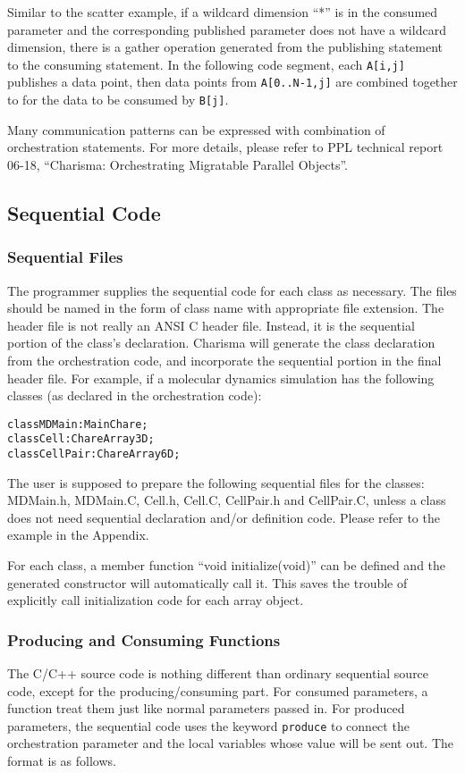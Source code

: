\documentclass[10pt]{article}
\def\code#1{{\small {\tt {#1}}}}
\begin{document}
Similar to the scatter example, if a wildcard dimension ``*'' is in the
consumed parameter and the corresponding published parameter does not have a
wildcard dimension, there is a gather operation generated from the publishing
statement to the consuming statement. In the following code segment, each 
\code{A[i,j]} publishes a data point, then data points from \code{A[0..N-1,j]} are
combined together to for the data to be consumed by \code{B[j]}.  

Many communication patterns can be expressed with combination of orchestration
statements. For more details, please refer to PPL technical report 06-18,
``Charisma: Orchestrating Migratable Parallel Objects''.

\subsection{Sequential Code}
\label{sec:sequential}

\subsubsection{Sequential Files}
The programmer supplies the sequential code for each class as necessary. The
files should be named in the form of class name with appropriate file extension.
The header file is not really an ANSI C header file. Instead, it is the
sequential portion of the class's declaration. Charisma will generate the class 
declaration from the orchestration code, and incorporate the sequential portion
in the final header file. For example, if a molecular dynamics simulation has
the following classes (as declared in the orchestration code):

\begin{alltt}
    class MDMain : MainChare;
    class Cell : ChareArray3D;
    class CellPair : ChareArray6D;
\end{alltt}

The user is supposed to prepare the following sequential files for the classes:
MDMain.h, MDMain.C, Cell.h, Cell.C, CellPair.h and CellPair.C, unless a class
does not need sequential declaration and/or definition code. Please refer to the
example in the Appendix. 

For each class, a member function ``void initialize(void)'' can be defined and
the generated constructor will automatically call it. This saves the trouble of 
explicitly call initialization code for each array object. 

\subsubsection{Producing and Consuming Functions}
The C/C++ source code is nothing different than ordinary sequential source code,
except for the producing/consuming part. For consumed parameters, a function
treat them just like normal parameters passed in. For produced parameters, the
sequential code uses the keyword \code{produce} to connect the orchestration
parameter and the local variables whose value will be sent out. The format is as
follows.
\end{document}

